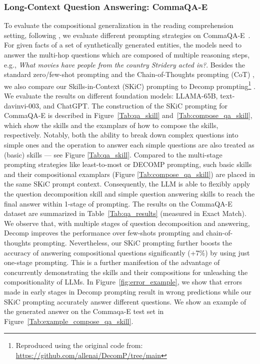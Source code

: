 \documentclass{article} \usepackage{arxiv}
\begin{document}
\subsubsection{Long-Context Question Answering: CommaQA-E}  
To evaluate the compositional generalization in the reading comprehension setting, following \citeauthor{khot2022decomposed}, we evaluate different prompting strategies on CommaQA-E~\citep{khot2021hey}. For given facts of a set of synthetically generated entities, the models need to answer the multi-hop questions which are composed of multiple reasoning steps, e.g., \textit{What movies have people from the country Stridery acted in?}. Besides the standard zero/few-shot prompting \citep{brown2020language} and the Chain-of-Thoughts prompting (CoT) \citep{wei2022chain}, we also compare our Skills-in-Context (SKiC) prompting to Decomp prompting\footnote{Reproduced using the original code from: \url{https://github.com/allenai/DecomP/tree/main}} \citep{khot2022decomposed}. We evaluate the results on different foundation models: LLAMA-65B, text-davinvi-003, and ChatGPT. The construction of the SKiC prompting for CommaQA-E is described in Figure~\ref{Tab:qa_skill} and~\ref{Tab:compose_qa_skill}, which show the skills and the examplars of how to compose the skills, respectively. Notably, both the ability to break down complex questions into simple ones and the operation to answer each simple questions are also treated as (basic) skills --- see Figure \ref{Tab:qa_skill}. Compared to the multi-stage prompting strategies like least-to-most or DECOMP prompting, such basic skills and their compositional examplars (Figure \ref{Tab:compose_qa_skill}) are placed in the same SKiC prompt context. Consequently, the LLM is able to flexibly apply the question decomposition skill and simple question answering skills to reach the final answer within 1-stage of prompting. The results on the CommaQA-E dataset are summarized in Table~\ref{Tab:qa_results} (measured in Exact Match). We observe that, with multiple stages of question decomposition and answering, Decomp improves the performance over few-shots prompting and chain-of-thoughts prompting. Nevertheless, our SKiC prompting further boosts the accuracy of answering compositional questions significantly (+7\%) by using just one-stage prompting. This is a further manifestion of the advantage of concurrently demonstrating the skills and their compositions for unleashing the compositionality of LLMs. In Figure~\ref{fig:error_example}, we show that errors made in early stages in Decomp prompting result in wrong predictions while our SKiC prompting accurately answer different questions. We show an example of the generated answer on the Commaqa-E test set in Figure~\ref{Tab:example_compose_qa_skill}.
\end{document}
